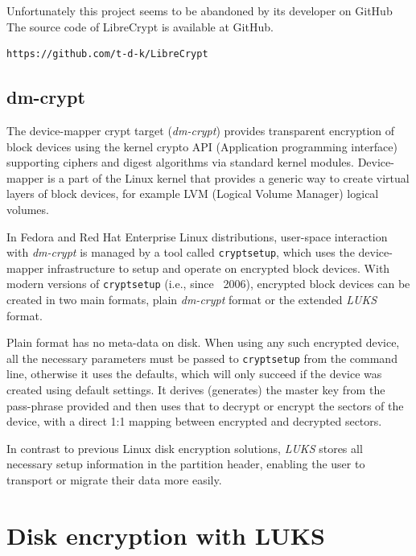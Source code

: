 Unfortunately this project seems to be abandoned by its developer on GitHub
The source code of LibreCrypt is available at GitHub.
\begin{lstlisting}[columns=fixed,basicstyle=\ttfamily\footnotesize,tabsize=4,backgroundcolor=\color{yellow!10}]
https://github.com/t-d-k/LibreCrypt
\end{lstlisting}



\subsection{dm-crypt}\label{dm-crypt}

The device-mapper crypt target ({\it dm-crypt}) provides transparent encryption of block devices using the kernel crypto API (Application programming interface) supporting ciphers and digest algorithms via standard kernel modules.
Device-mapper is a part of the Linux kernel that provides a generic way to create virtual layers of block devices, for example LVM (Logical Volume Manager) logical volumes.

In Fedora and Red Hat Enterprise Linux distributions, user-space interaction with {\it dm-crypt} is managed by a tool called {\tt cryptsetup}, which uses the device-mapper infrastructure to setup and operate on encrypted block devices.
With modern versions of {\tt cryptsetup} (i.e., since ~2006), encrypted block devices can be created in two main formats, plain {\it dm-crypt} format or the extended {\it LUKS} format.

Plain format has no meta-data on disk.
When using any such encrypted device, all the necessary parameters must be passed to {\tt cryptsetup} from the command line, otherwise it uses the defaults, which will only succeed if the device was created using default settings.
It derives (generates) the master key from the pass-phrase provided and then uses that to decrypt or encrypt the sectors of the device, with a direct 1:1 mapping between encrypted and decrypted sectors.

In contrast to previous Linux disk encryption solutions, {\it LUKS} stores all necessary setup information in the partition header, enabling the user to transport or migrate their data more easily.



\section{Disk encryption with LUKS}\label{LUKS}

